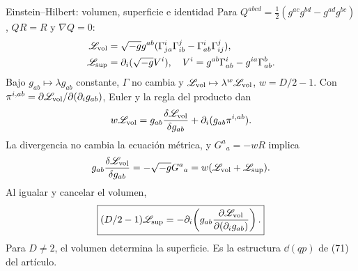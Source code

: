 \begin{frame}[label=holo-ll-04]{Einstein--Hilbert: volumen, superficie e identidad}
\footnotesize\CompactDisplaySpacing
Para $Q^{abcd}=\tfrac12(g^{ac}g^{bd}-g^{ad}g^{bc})$, $QR=R$ y $\nabla Q=0$:
\begin{equation}
\begin{aligned}
\mathscr L_{\rm vol}&=\sqrt{-g}g^{ab}(\Gamma^i_{ja}\Gamma^j_{ib}-\Gamma^i_{ab}\Gamma^j_{ij}),\\
\mathscr L_{\rm sup}&=\partial_i(\sqrt{-g}V^i),\quad
V^i=g^{ab}\Gamma^i_{ab}-g^{ia}\Gamma^b_{ab}.
\end{aligned}
\label{eq:holo-EH-split}
\end{equation}
Bajo $g_{ab}\mapsto\lambda g_{ab}$ constante, $\Gamma$ no cambia y
$\mathscr L_{\rm vol}\mapsto\lambda^w\mathscr L_{\rm vol}$, $w=D/2-1$.
Con $\pi^{i,ab}=\partial\mathscr L_{\rm vol}/\partial(\partial_i g_{ab})$, Euler y la regla del producto dan
\[
w\mathscr L_{\rm vol}=g_{ab}\frac{\delta\mathscr L_{\rm vol}}{\delta g_{ab}}
+\partial_i(g_{ab}\pi^{i,ab}).
\]
La divergencia no cambia la ecuación métrica, y $G^a{}_a=-wR$ implica
\[
g_{ab}\frac{\delta\mathscr L_{\rm vol}}{\delta g_{ab}}
=-\sqrt{-g}G^a{}_a=w(\mathscr L_{\rm vol}+\mathscr L_{\rm sup}).
\]
Al igualar y cancelar el volumen,
\begin{equation}
\boxed{(D/2-1)\mathscr L_{\rm sup}
=-\partial_i\!\left(g_{ab}\frac{\partial\mathscr L_{\rm vol}}{\partial(\partial_i g_{ab})}\right).}
\label{eq:holo-EH-identity}
\end{equation}
Para $D\ne2$, el volumen determina la superficie. Es la estructura $\dd(qp)$ de (71) del artículo.
\end{frame}

